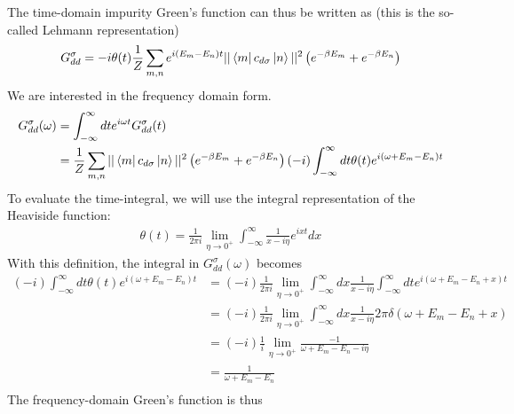 \documentclass[twoside,11pt]{report}
\numberwithin{equation}{section}
\begin{document}
The time-domain impurity Green's function can thus be written as (this is the so-called Lehmann representation)
\begin{equation}\begin{aligned}
	G_{dd}^\sigma = -i\theta(t)\frac{1}{Z}\sum_{m,n}e^{i\left( E_m - E_n \right)  t}||\bra{m}c_{d\sigma}\ket{n}||^2\left( e^{-\beta E_m} + e^{-\beta E_n}\right)\\
\end{aligned}\end{equation}
We are interested in the frequency domain form.
\begin{equation}\begin{aligned}
	G_{d d}^\sigma(\omega) &= \int_{-\infty}^\infty dt e^{i \omega t}G_{d d}^\sigma(t) \\
			       &= \frac{1}{Z}\sum_{m,n}||\bra{m}c_{d\sigma}\ket{n}||^2\left( e^{-\beta E_m} + e^{-\beta E_n}\right)\left(-i\right)\int_{-\infty}^\infty dt \theta(t)e^{i\left( \omega + E_m - E_n \right)t}
\end{aligned}\end{equation}
To evaluate the time-integral, we will use the integral representation of the Heaviside function:
\begin{equation}\begin{aligned}
	\theta(t) = \frac{1}{2\pi i}\lim_{\eta \to 0^+} \int_{-\infty}^\infty \frac{1}{x- i\eta}e^{ixt}dx
\end{aligned}\end{equation}
With this definition, the integral in \(G_{dd}^\sigma(\omega)\) becomes
\begin{equation}\begin{aligned}
	\left(-i\right)\int_{-\infty}^\infty dt \theta(t)e^{i\left( \omega + E_m - E_n \right)t} &= \left(-i\right)\frac{1}{2\pi i}\lim_{\eta \to 0^+} \int_{-\infty}^\infty dx\frac{1}{x- i\eta}\int_{-\infty}^\infty dt e^{i\left( \omega + E_m - E_n + x\right)t} \\
									     &=\left(-i\right)\frac{1}{2\pi i}\lim_{\eta \to 0^+} \int_{-\infty}^\infty dx\frac{1}{x- i\eta} 2\pi \delta\left( \omega + E_m - E_n + x\right) \\
									     &=\left(-i\right)\frac{1}{i}\lim_{\eta \to 0^+} \frac{-1}{\omega + E_m - E_n- i\eta} \\
									     &=\frac{1}{\omega + E_m - E_n} \\
\end{aligned}\end{equation}
The frequency-domain Green's function is thus
\end{document}
